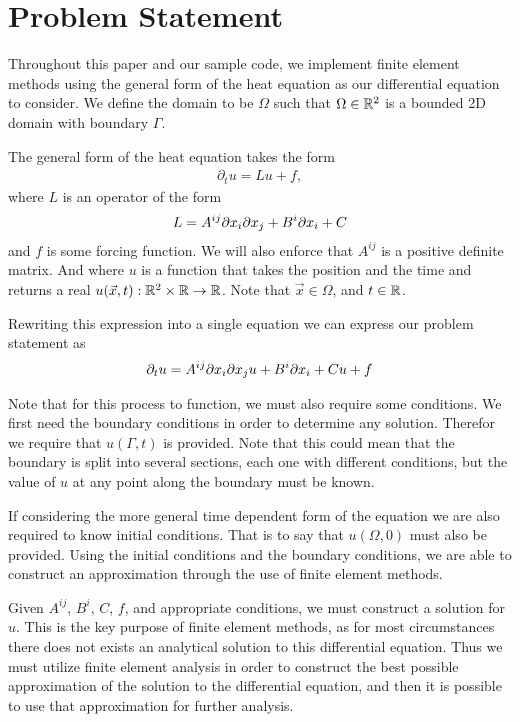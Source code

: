 \documentclass[../fem.tex]{subfile}
\begin{document}
\section{Problem Statement}%
\label{sec:problem_statement}

Throughout this paper and our sample code, we implement finite element methods
using the general form of the heat equation as our differential equation to
consider. We define the domain to be $\Omega$ such that $\Omega \in \mathbb{R}^2$ is a
bounded 2D domain with boundary $\Gamma$.

The general form of the heat equation takes the form
\begin{align*}
  \partial_t u=Lu+f,
\end{align*}
where $L$ is an operator of the form
\begin{align*}
  L=A^{ij}{\partial x}_i{\partial x}_j+B^i{\partial x}_i+C
\end{align*}
and $f$ is some forcing function. We will also enforce that $A^{ij}$ is
a positive definite matrix. And where $u$ is a function that takes the position
and the time and returns a real $u(\vec{x},t):\mathbb{R}^2\times\mathbb{R}\rightarrow\mathbb{R}$. Note
that $\vec{x}\in\Omega$, and $t\in\mathbb{R}$.

Rewriting this expression into a single equation we can express our problem
statement as
\begin{align}
  \partial_t u=A^{ij}{\partial x}_i{\partial x}_j u+B^i{\partial x}_i+Cu+f
\end{align}

Note that for this process to function, we must also require some conditions.
We first need the boundary conditions in order to determine any solution.
Therefor we require that $u(\Gamma, t)$ is provided. Note that this could mean
that the boundary is split into several sections, each one with different
conditions, but the value of $u$ at any point along the boundary must be known.

If considering the more general time dependent form of the equation we are also
required to know initial conditions. That is to say that $u(\Omega,0)$ must
also be provided. Using the initial conditions and the boundary conditions, we
are able to construct an approximation through the use of finite element
methods.

Given $A^{ij}$, $B^i$, $C$, $f$, and appropriate conditions, we must construct
a solution for $u$. This is the key purpose of finite element methods, as for
most circumstances there does not exists an analytical solution to this
differential equation. Thus we must utilize finite element analysis in order to
construct the best possible approximation of the solution to the differential
equation, and then it is possible to use that approximation for further
analysis.
\end{document}
